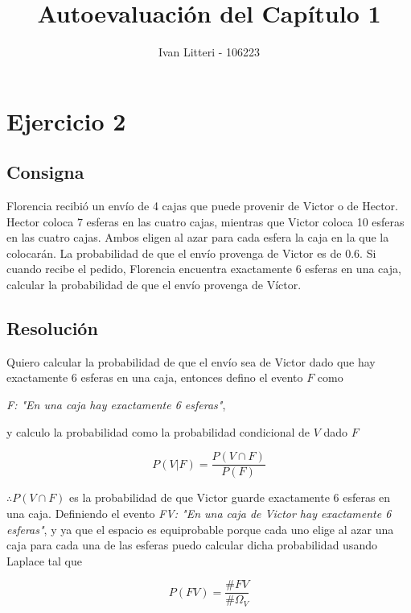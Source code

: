 \documentclass[hidelinks]{article}
\title{Autoevaluación del Capítulo 1}
\author{Ivan Litteri - 106223}
\date{}
\begin{document}
\maketitle

\section*{Ejercicio 2}

\subsection*{Consigna}
Florencia recibió un envío de 4 cajas que puede provenir de Victor o de Hector. Hector coloca 7 esferas en las cuatro cajas, mientras que Victor coloca 10 esferas en las cuatro cajas. Ambos eligen al azar para cada esfera la caja en la que la colocarán. La probabilidad de que el envío provenga de Victor es de 0.6. Si cuando recibe el pedido, Florencia encuentra exactamente 6 esferas en una caja, calcular la probabilidad de que el envío provenga de Víctor.

\subsection*{Resolución}

Quiero calcular la probabilidad de que el envío sea de Victor dado que hay exactamente 6 esferas en una caja, entonces defino el evento $F$ como

\begin{center}
    \textit{F: "En una caja hay exactamente 6 esferas"},
\end{center}

y calculo la probabilidad como la probabilidad condicional de $V$ dado $F$

\begin{equation}
    P(V|F) = \frac{P(V \cap F)}{P(F)}
\end{equation}

$\therefore P(V \cap F)$ es la probabilidad de que Victor guarde exactamente 6 esferas en una caja. Definiendo el evento \textit{FV: "En una caja de Victor hay exactamente 6 esferas"}, y ya que el espacio es equiprobable porque cada uno elige al azar una caja para cada una de las esferas puedo calcular dicha probabilidad usando Laplace tal que

\begin{equation}
    P(FV) = \frac{\#FV}{\#\Omega_{V}}
\end{equation}
\end{document}
